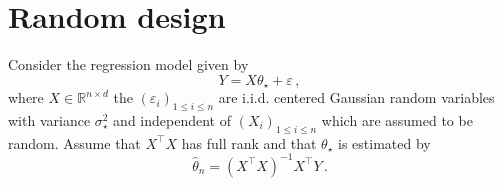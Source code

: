 \documentclass[a4paper,10pt,fleqn]{article}
\newcommand{\eqsp}{\,}
\newcommand{\rset}{\ensuremath{\mathbb{R}}}
\newcommand{\bP}{\mathbb{P}}
\newcommand{\1}{\ensuremath{\mathbbm{1}}}
\newcommand{\param}{\theta}
\begin{document}
\begin{enumerate}
%
\end{enumerate}
\section{Random design}
Consider the regression model given by
$$
Y = X\param_{\star}+ \varepsilon\eqsp,
$$
where $X\in\rset^{n\times d}$ the $(\varepsilon_{i})_{1\leqslant i \leqslant n}$ are i.i.d. centered Gaussian random variables with variance $\sigma_{\star}^2$ and independent of $(X_{i})_{1\leqslant i \leqslant n}$ which are assumed to be random. Assume that $X^\top X$ has full rank and that $\param_\star$ is estimated by 
$$
\widehat \param_n = (X^\top X)^{-1}X^\top Y\eqsp.
$$
\end{document}

